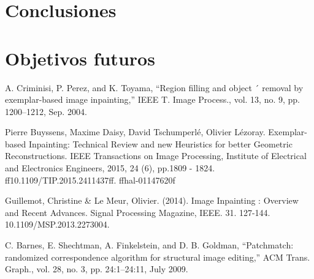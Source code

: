 \documentclass[conference]{IEEEtran}
\begin{document}



\section{Conclusiones}

\section{Objetivos futuros}


\begin{thebibliography}{00}
 A. Criminisi, P. Perez, and K. Toyama, “Region filling and object ´
removal by exemplar-based image inpainting,” IEEE T. Image Process.,
vol. 13, no. 9, pp. 1200–1212, Sep. 2004.

 Pierre Buyssens, Maxime Daisy, David Tschumperlé, Olivier Lézoray. Exemplar-based Inpainting:
Technical Review and new Heuristics for better Geometric Reconstructions. IEEE Transactions on
Image Processing, Institute of Electrical and Electronics Engineers, 2015, 24 (6), pp.1809 - 1824.
ff10.1109/TIP.2015.2411437ff. ffhal-01147620f

 Guillemot, Christine \& Le Meur, Olivier. (2014). Image Inpainting : Overview and Recent Advances. Signal Processing Magazine, IEEE. 31. 127-144. 10.1109/MSP.2013.2273004. 

 C. Barnes, E. Shechtman, A. Finkelstein, and D. B. Goldman, ``Patchmatch: randomized correspondence algorithm for structural image editing,'' ACM Trans. Graph., vol. 28, no. 3, pp. 24:1–24:11, July 2009.

\end{thebibliography}
\end{document}
